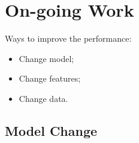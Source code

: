 \documentclass{beamer}
\begin{document}
    \section{On-going Work}
    \begin{frame}{\insertsection}
      Ways to improve the performance:
      \begin{itemize}
      \item Change model;
      \item Change features;
      \item Change data.
      \end{itemize}
    \end{frame}

    \subsection{Model Change}
\end{document}
